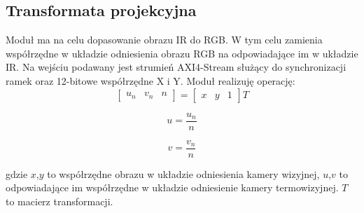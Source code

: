 \subsection {Transformata projekcyjna}
Moduł ma na celu dopasowanie obrazu IR do RGB. W tym celu zamienia współrzędne w układzie odniesienia obrazu RGB na odpowiadające im w układzie IR.
Na wejściu podawany jest strumień AXI4-Stream służący do synchronizacji ramek oraz 12-bitowe współrzędne X i Y. %
Moduł realizuję operację:
\begin{equation}
\begin{bmatrix}
u_n & v_n & n
\end{bmatrix}
=
\begin{bmatrix}
x & y & 1
\end{bmatrix}
T
\end{equation}

\begin{equation}
u = \frac{u_n}{n}
\end{equation}

\begin{equation}
v = \frac{v_n}{n}
\end{equation}

\noindent
gdzie $x$,$y$ to współrzędne obrazu w układzie odniesienia kamery wizyjnej, $u$,$v$ to odpowiadające im współrzędne w układzie odniesienie kamery termowizyjnej. $T$ to macierz transformacji.

